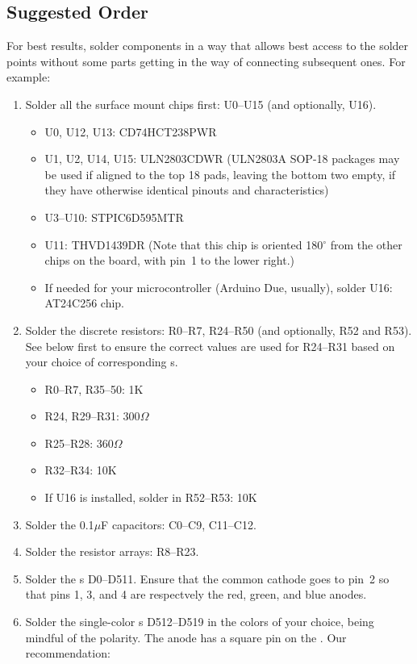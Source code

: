 \subsection{Suggested Order}
For best results, solder components in a way that allows best access to the solder points without some parts getting
in the way of connecting subsequent ones. For example:

\begin{enumerate}
	\item Solder all the surface mount chips first: U0--U15 (and optionally, U16).
		\begin{itemize}
			\item U0, U12, U13: CD74HCT238PWR
			\item U1, U2, U14, U15: ULN2803CDWR (ULN2803A SOP-18 packages may be used if aligned to the top 18 pads, leaving the bottom two empty, if they have otherwise identical pinouts and characteristics)
			\item U3--U10: STPIC6D595MTR
			\item U11: THVD1439DR (Note that this chip is oriented 180$^{\circ}$ from the other chips on the board, with pin~1 to the lower right.)
			\item If needed for your microcontroller (Arduino Due, usually), solder U16: AT24C256  chip.
		\end{itemize}
	\item Solder the discrete resistors: R0--R7, R24--R50 (and optionally, R52 and R53). See below first to ensure the correct values are used
		for R24--R31 based on your choice of corresponding \led s.
		\begin{itemize}
			\item R0--R7, R35--50: 1K
			\item R24, R29--R31: 300$\Omega$
			\item R25--R28: 360$\Omega$
			\item R32--R34: 10K
			\item If U16 is installed, solder in R52--R53: 10K
		\end{itemize}
	\item Solder the 0.1$\mu$F capacitors: C0--C9, C11--C12.
	\item Solder the resistor arrays: R8--R23.
	\item Solder the  \led s D0--D511. Ensure that the common cathode goes to pin~2 so that pins 1, 3, and 4
		are respectvely the red, green, and blue anodes.
	\item Solder the single-color \led s D512--D519 in the colors of your choice, being mindful of the polarity. The anode has a square pin on the . Our recommendation:

\end{enumerate}
